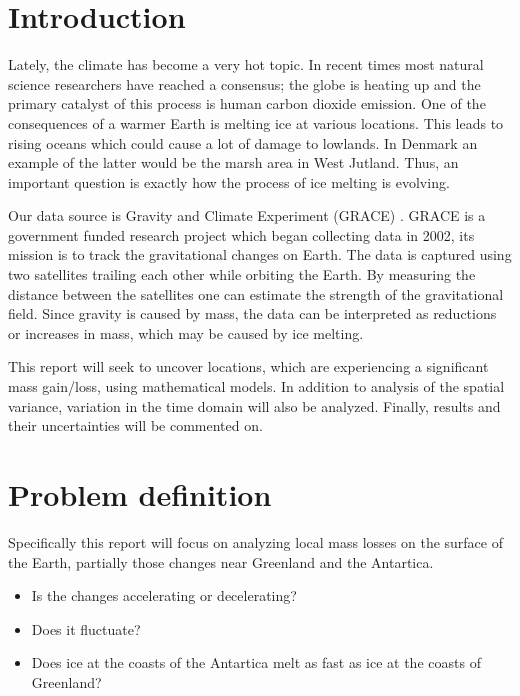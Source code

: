 \section{Introduction}
Lately, the climate has become a very hot topic. 
In recent times most natural science researchers have reached a consensus;
the globe is heating up and the primary catalyst of this process is human carbon dioxide emission.
One of the consequences of a warmer Earth is melting ice at various locations.
This leads to rising oceans which could cause a lot of damage to lowlands.
In Denmark an example of the latter would be the marsh area in West Jutland.
Thus, an important question is exactly how the process of ice melting is evolving.

Our data source is Gravity and Climate Experiment (GRACE) \cite{GRACE-data-source}. 
GRACE is a government funded research project which began collecting data in 2002, its mission is to track the gravitational changes on Earth.
The data is captured using two satellites trailing each other while orbiting the Earth.
By measuring the distance between the satellites one can estimate the strength of the gravitational field.
Since gravity is caused by mass, the data can be interpreted as reductions or increases in mass, which may be caused by ice melting.

This report will seek to uncover locations, which are experiencing a significant mass gain/loss, using mathematical models. 
In addition to analysis of the spatial variance, variation in the time domain will also be analyzed.
Finally, results and their uncertainties will be commented on.

\section{Problem definition}
Specifically this report will focus on analyzing local mass losses on the surface of the Earth, partially those changes near Greenland and the Antartica.

\begin{itemize}
\item Is the changes accelerating or decelerating?
\item Does it fluctuate?
\item Does ice at the coasts of the Antartica melt as fast as ice at the coasts of Greenland?
\end{itemize}

